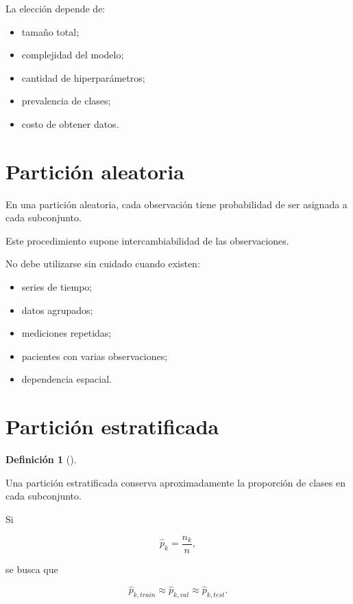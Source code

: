 \documentclass[
  spanish,
  11pt,
  letterpaper,
  DIV=11,
  numbers=noendperiod]{scrreprt}
\providecommand{\tightlist}{%
  \setlength{\itemsep}{0pt}\setlength{\parskip}{0pt}}
\theoremstyle{definition}
\newtheorem{definition}{Definición}[chapter]
\theoremstyle{plain}
\theoremstyle{definition}
\theoremstyle{remark}
\begin{document}
La elección depende de:

\begin{itemize}
\tightlist
\item
  tamaño total;
\item
  complejidad del modelo;
\item
  cantidad de hiperparámetros;
\item
  prevalencia de clases;
\item
  costo de obtener datos.
\end{itemize}

\section{Partición aleatoria}\label{particiuxf3n-aleatoria}

En una partición aleatoria, cada observación tiene probabilidad de ser
asignada a cada subconjunto.

Este procedimiento supone intercambiabilidad de las observaciones.

No debe utilizarse sin cuidado cuando existen:

\begin{itemize}
\tightlist
\item
  series de tiempo;
\item
  datos agrupados;
\item
  mediciones repetidas;
\item
  pacientes con varias observaciones;
\item
  dependencia espacial.
\end{itemize}

\section{Partición estratificada}\label{particiuxf3n-estratificada}

\begin{definition}[]\protect\hypertarget{def-particion-estratificada}{}\label{def-particion-estratificada}

Una partición estratificada conserva aproximadamente la proporción de
clases en cada subconjunto.

\end{definition}

Si

\[
\widehat{p}_k
=
\frac{n_k}{n},
\]

se busca que

\[
\widehat{p}_{k,train}
\approx
\widehat{p}_{k,val}
\approx
\widehat{p}_{k,test}.
\]
\end{document}
